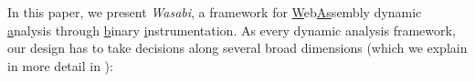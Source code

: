 \documentclass[sigplan,review,anonymous]{acmart}\settopmatter{printfolios=true,printccs=false,printacmref=false}
\begin{document}

\noindent
In this paper, we present \emph{Wasabi}, a framework for \underline{W}eb\-\underline{As}sembly dynamic \underline{a}nalysis through \underline{b}inary \underline{i}nstrumentation. As every dynamic analysis framework, our design has to take decisions along several broad dimensions (which we explain in more detail in ):
\end{document}
